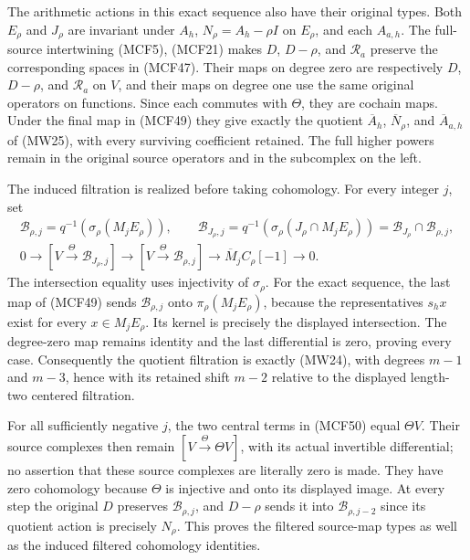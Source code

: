 The arithmetic actions in this exact sequence also have their
original types.  Both $E_\rho$ and $J_\rho$ are invariant under
$A_h$, $N_\rho=A_h-\rho I$ on $E_\rho$, and each $A_{a,h}$.
The full-source intertwining (MCF5), (MCF21) makes
$D$, $D-\rho$, and $\mathcal R_a$ preserve the corresponding
spaces in (MCF47).  Their maps on degree zero are respectively
$D$, $D-\rho$, and $\mathcal R_a$ on $V$, and their maps on
degree one use the same original operators on functions.
Since each commutes with $\Theta$, they are cochain maps.
Under the final map in (MCF49) they give exactly the quotient
$\overline A_h$, $\overline N_\rho$, and $\overline A_{a,h}$
of (MW25), with every surviving coefficient retained.  The
full higher powers remain in the original source operators and
in the subcomplex on the left.

The induced filtration is realized before taking cohomology.
For every integer $j$, set
\[
\begin{gathered}
\mathscr B_{\rho,j}=q^{-1}(\sigma_\rho(M_jE_\rho)),\qquad
\mathscr B_{J_\rho,j}
  =q^{-1}(\sigma_\rho(J_\rho\cap M_jE_\rho))
  =\mathscr B_{J_\rho}\cap\mathscr B_{\rho,j},\\
0\longrightarrow[V\xrightarrow{\Theta}\mathscr B_{J_\rho,j}]
\longrightarrow[V\xrightarrow{\Theta}\mathscr B_{\rho,j}]
\longrightarrow\overline M_jC_\rho[-1]\longrightarrow0.
\end{gathered}
\tag{MCF50}
\]
The intersection equality uses injectivity of $\sigma_\rho$.
For the exact sequence, the last map of (MCF49) sends
$\mathscr B_{\rho,j}$ onto $\pi_\rho(M_jE_\rho)$, because the
representatives $s_hx$ exist for every $x\in M_jE_\rho$.
Its kernel is precisely the displayed intersection.  The
degree-zero map remains identity and the last differential is
zero, proving every case.  Consequently the quotient filtration
is exactly (MW24), with degrees $m-1$ and $m-3$, hence with its
retained shift $m-2$ relative to the displayed length-two
centered filtration.

For all sufficiently negative $j$, the two central terms in
(MCF50) equal $\Theta V$.  Their source complexes then remain
$[V\xrightarrow{\Theta}\Theta V]$, with its actual invertible
differential; no assertion that these source complexes are
literally zero is made.  They have zero cohomology because
$\Theta$ is injective and onto its displayed image.  At every
step the original $D$ preserves $\mathscr B_{\rho,j}$, and
$D-\rho$ sends it into $\mathscr B_{\rho,j-2}$ since its
quotient action is precisely $N_\rho$.  This proves the
filtered source-map types as well as the induced filtered
cohomology identities.

